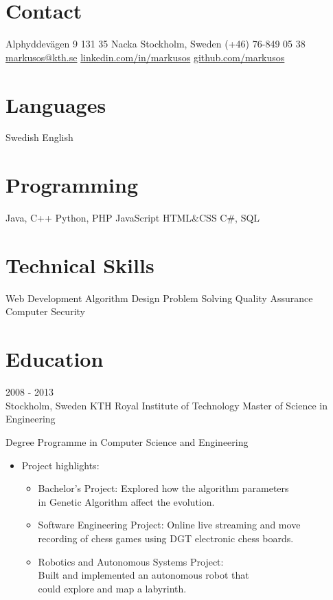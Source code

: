 \documentclass{markusos-cv}
\begin{document}


\begin{aside}
\section{Contact}
Alphyddevägen 9
131 35 Nacka
Stockholm, Sweden
(+46) 76-849 05 38
~
\href{mailto:markusos@kth.se}{markusos@kth.se}
\href{http://www.linkedin.com/in/markusos}{linkedin.com/in/markusos}
\href{https://github.com/markusos}{github.com/markusos}
\section{Languages}
Swedish
English
\section{Programming}
Java, C++
Python, PHP
JavaScript
HTML\&CSS
C\#, SQL
\section{Technical Skills}
Web Development
Algorithm Design
Problem Solving
Quality Assurance
Computer Security
\end{aside}


\section{Education}

\begin{entrylist}
\entry
{2008 - 2013 \\}
{Stockholm, Sweden}
{KTH Royal Institute of Technology}
{Master of Science in Engineering}
{
Degree Programme in Computer Science and Engineering
\begin{itemize}
	\item Project highlights: 
	\begin{itemize}
		\item Bachelor’s Project: Explored how the algorithm parameters\\ in Genetic Algorithm affect the evolution.
		\item Software Engineering Project: Online live streaming and move\\ recording of chess games using DGT electronic chess boards. 
		\item Robotics and Autonomous Systems Project:\\ Built and implemented an autonomous robot that\\ could explore and map a labyrinth.
	\end{itemize}
\end{itemize}
}
\end{entrylist}
\end{document}
